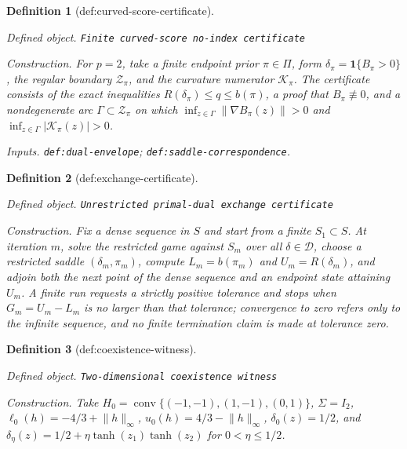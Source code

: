 \documentclass{article}
\newtheorem{definition}{Definition}
\begin{document}
\begin{definition}[def:curved-score-certificate]\label{def:curved-score-certificate}
\par\smallskip\noindent\emph{Defined object.} \texttt{Finite curved-\allowbreak{}score no-\allowbreak{}index certificate}
\par\smallskip\noindent\emph{Construction.} For \(p=2\), take a finite endpoint prior \(\pi\in\Pi\), form \(\delta_{\pi}=\mathbf 1\{B_{\pi}>0\}\), the regular boundary \(\mathcal Z_{\pi}\), and the curvature numerator \(\mathcal K_{\pi}\). The certificate consists of the exact inequalities \(R(\delta_{\pi})\le q\le b(\pi)\), a proof that \(B_{\pi}\not\equiv0\), and a nondegenerate arc \(\Gamma\subset\mathcal Z_{\pi}\) on which \(\inf_{z\in\Gamma}\lVert\nabla B_{\pi}(z)\rVert>0\) and \(\inf_{z\in\Gamma}|\mathcal K_{\pi}(z)|>0\).
\par\smallskip\noindent\emph{Inputs.} \texttt{def:\allowbreak{}dual-\allowbreak{}envelope}; \texttt{def:\allowbreak{}saddle-\allowbreak{}correspondence}.
\end{definition}

\begin{definition}[def:exchange-certificate]\label{def:exchange-certificate}
\par\smallskip\noindent\emph{Defined object.} \texttt{Unrestricted primal-\allowbreak{}dual exchange certificate}
\par\smallskip\noindent\emph{Construction.} Fix a dense sequence in \(S\) and start from a finite \(S_1\subset S\). At iteration \(m\), solve the restricted game against \(S_m\) over all \(\delta\in\mathcal D\), choose a restricted saddle \((\delta_m,\pi_m)\), compute \(L_m=b(\pi_m)\) and \(U_m=R(\delta_m)\), and adjoin both the next point of the dense sequence and an endpoint state attaining \(U_m\). A finite run requests a strictly positive tolerance and stops when \(G_m=U_m-L_m\) is no larger than that tolerance; convergence to zero refers only to the infinite sequence, and no finite termination claim is made at tolerance zero.
\end{definition}

\begin{definition}[def:coexistence-witness]\label{def:coexistence-witness}
\par\smallskip\noindent\emph{Defined object.} \texttt{Two-\allowbreak{}dimensional coexistence witness}
\par\smallskip\noindent\emph{Construction.} Take \(H_0=\operatorname{conv}\{(-1,-1),(1,-1),(0,1)\}\), \(\Sigma=I_2\), \(\ell_0(h)=-4/3+\lVert h\rVert_{\infty}\), \(u_0(h)=4/3-\lVert h\rVert_{\infty}\), \(\delta_0(z)=1/2\), and \(\delta_{\eta}(z)=1/2+\eta\tanh(z_1)\tanh(z_2)\) for \(0<\eta\le1/2\).
\end{definition}
\end{document}
